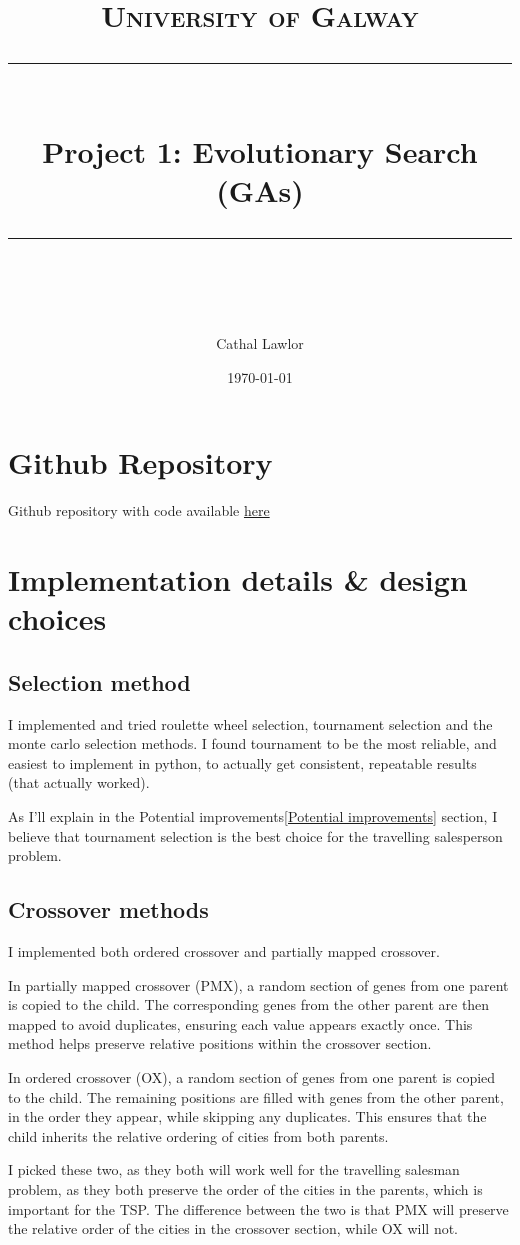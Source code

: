 \documentclass[11pt]{scrartcl} %
\title{	
	\normalfont\normalsize
	\textsc{University of Galway}\\ %
	\vspace{25pt} %
	\rule{\linewidth}{0.5pt}\\ %
	\vspace{20pt} %
	{\huge  Project 1: Evolutionary Search (GAs)}\\ %
	\vspace{12pt} %
	\rule{\linewidth}{2pt}\\ %
	\vspace{12pt} %
}
\author{\LARGE Cathal Lawlor} %
\date{\normalsize\today} %
\begin{document}
\maketitle %

\section{Github Repository}
Github repository with code available \href{https://github.com/Laan33/ai_project_1}{here}

\section{Implementation details \& design choices}

\subsection{Selection method}
I implemented and tried roulette wheel selection, tournament selection and the monte carlo selection methods.
I found tournament to be the most reliable, and easiest to implement in python, to actually get consistent, repeatable results (that actually worked).

As I'll explain in the Potential improvements\ref{Potential improvements} section, I believe that tournament selection is the best choice for the travelling salesperson problem.
\subsection{Crossover methods}

I implemented both ordered crossover and partially mapped crossover. 

In partially mapped crossover (PMX)\cite{baeldung_pmx}, a random section of genes from one parent is copied to the child. The corresponding genes from the other parent are then mapped to avoid duplicates, ensuring each value appears exactly once. This method helps preserve relative positions within the crossover section.

In ordered crossover (OX)\cite{ordered_crossover_stackoverflow}, a random section of genes from one parent is copied to the child. The remaining positions are filled with genes from the other parent, in the order they appear, while skipping any duplicates. This ensures that the child inherits the relative ordering of cities from both parents.

I picked these two, as they both will work well for the travelling salesman problem, as they both preserve the order of the cities in the parents, which is important for the TSP.
The difference between the two is that PMX will preserve the relative order of the cities in the crossover section, while OX will not.
\end{document}
